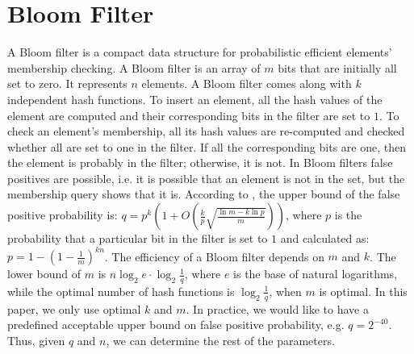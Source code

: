 


\section{Bloom Filter}\label{sec::bloom-filter-}

A Bloom filter \cite{DBLP:journals/cacm/Bloom70} is a compact data structure for probabilistic efficient  elements'  membership checking. A Bloom filter is an array of $m$ bits that are  initially all set to zero. It  represents $n$  elements.  A Bloom filter comes along with  $k$ independent hash functions. To insert an element, all the  hash values of the element are computed and their corresponding bits in the filter are set to $1$. To check an element's  membership, all its hash values are re-computed and checked whether all are set to one in the filter. If all the corresponding bits are one, then the element is probably in the filter; otherwise, it is not. In Bloom filters false positives are possible, i.e. it is possible that an element is not in the set, but the membership query shows that it is. According to \cite{BoseGKMMMST08}, the upper bound of the false positive probability is: $q=p^{\scriptscriptstyle k}(1+O(\frac{k}{p}\sqrt{\frac{\ln m - k \ln p}{m}}))$,  where $p$ is the probability that a particular bit in the filter is set to $1$ and calculated as: $p=1-(1-\frac{1}{m})^{\scriptscriptstyle kn}$. The efficiency of a Bloom filter depends
on  $m$ and $k$. The lower bound of $m$  is $ n \log_{\scriptscriptstyle 2}
e \cdot\log_{\scriptscriptstyle 2} \frac{1}{q}$, where $e$ is the base of natural logarithms,  while the optimal number of hash functions is    $\log_{\scriptscriptstyle 2} \frac{1}{q}$, when $m$ is optimal. In this paper, we only use optimal $k$ and $m$. In practice, we would like to have a predefined acceptable upper bound on false positive probability, e.g. $q=2^{\scriptscriptstyle - 40}$. Thus, given $q$ and $n$, we can determine the rest  of the parameters. 

